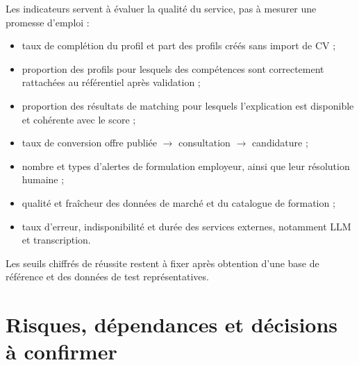 \documentclass[11pt,a4paper]{article}
\begin{document}
Les indicateurs servent à évaluer la qualité du service, pas à mesurer une promesse d'emploi :
\begin{itemize}
  \item taux de complétion du profil et part des profils créés sans import de CV ;
  \item proportion des profils pour lesquels des compétences sont correctement rattachées au référentiel après validation ;
  \item proportion des résultats de matching pour lesquels l'explication est disponible et cohérente avec le score ;
  \item taux de conversion offre publiée $\rightarrow$ consultation $\rightarrow$ candidature ;
  \item nombre et types d'alertes de formulation employeur, ainsi que leur résolution humaine ;
  \item qualité et fraîcheur des données de marché et du catalogue de formation ;
  \item taux d'erreur, indisponibilité et durée des services externes, notamment LLM et transcription.
\end{itemize}

Les seuils chiffrés de réussite restent à fixer après obtention d'une base de référence et des données de test représentatives.

\section{Risques, dépendances et décisions à confirmer}
\end{document}

